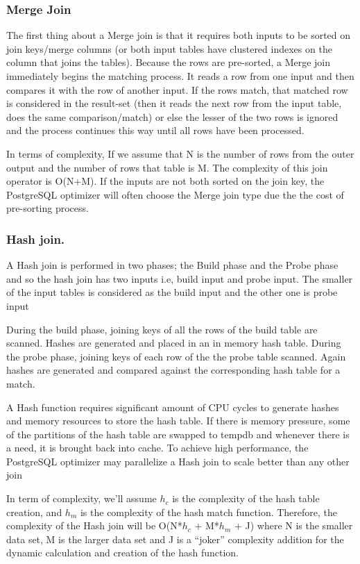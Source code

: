 \subsubsection{Merge Join}
{\justify
The first thing about a Merge join \cite{physical operators} is that it requires both inputs to be sorted on join keys/merge columns (or both input tables have clustered indexes on the column that joins the tables). Because the rows are pre-sorted, a Merge join immediately begins the matching process. It reads a row from one input and then compares it with the row of another input. If the rows match, that matched row is considered in the result-set (then it reads the next row from the input table, does the same comparison/match) or else the lesser of the two rows is ignored and the process continues this way until all rows have been processed.
\par }
\vspace{0.5cm}
{\justify
In terms of complexity, If we assume that N is the number of rows from the outer output and the number of rows that table is M. The complexity of this join operator is O(N+M). If the inputs are not both sorted on the join key, the PostgreSQL optimizer will often choose the Merge join type due the the cost of pre-sorting process.
\par }
\vspace{0.5cm}
\subsubsection{Hash join.}
{\justify
A Hash join \cite{physical operators} is performed in two phases; the Build phase and the Probe phase and so the hash join has two inputs i.e, build input and probe input. The smaller of the input tables is considered as the build input and the other one is probe input
\par }
\vspace{0.5cm}
{\justify
During the build phase, joining keys of all the rows of the build table are scanned. Hashes are generated and placed in an in memory hash table. During the probe phase, joining keys of each row of the the probe table scanned. Again hashes are generated and compared against the corresponding hash table for a match. 
\par }
\vspace{0.5cm}
{\justify
A Hash function requires significant amount of CPU cycles to generate hashes and memory resources to store the hash table. If there is memory pressure, some of the partitions of the hash table are swapped to tempdb and whenever there is a need, it is brought back into cache. To achieve high performance, the PostgreSQL optimizer may parallelize a Hash join to scale better than any other join
\par }
\vspace{0.5cm}
{\justify
 In term of complexity, we’ll assume $h_c$ is the complexity of the hash table creation, and $h_m$ is the complexity of the hash match function. Therefore, the complexity of the Hash join will be O(N*$h_c$ + M*$h_m$ + J) where N is the smaller data set, M is the larger data set and J is a “joker” complexity addition for the dynamic calculation and creation of the hash function.
\par }
\vspace{0.5cm}
